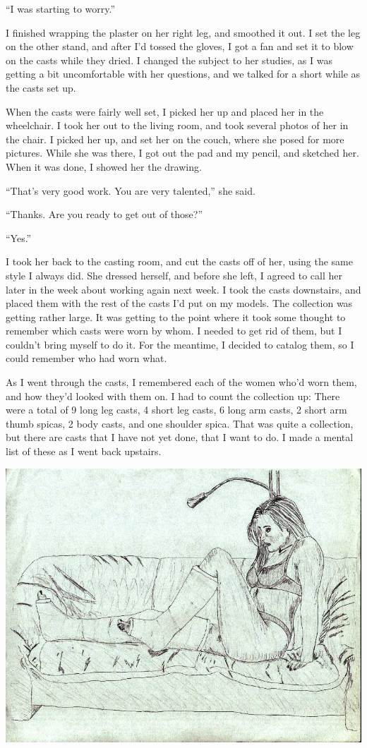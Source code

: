 ``I was starting to worry.''

I finished wrapping the plaster on her right leg, and smoothed it out. I set the leg on
the other stand, and after I'd tossed the gloves, I got a fan and set it to blow on the casts
while they dried. I changed the subject to her studies, as I was getting a bit uncomfortable
with her questions, and we talked for a short while as the casts set up.

When the casts were fairly well set, I picked her up and placed her in the wheelchair. I
took her out to the living room, and took several photos of her in the chair. I picked her up,
and set her on the couch, where she posed for more pictures. While she was there, I got out the
pad and my pencil, and sketched her. When it was done, I showed her the drawing.


``That's very good work. You are very talented,'' she said.

``Thanks. Are you ready to get out of those?''

``Yes.''

I took her back to the casting room, and cut the casts off of her, using the same style I
always did. She dressed herself, and before she left, I agreed to call her later in the week
about working again next week. I took the casts downstairs, and placed them with the rest of the
casts I'd put on my models. The collection was getting rather large. It was getting to the point
where it took some thought to remember which casts were worn by whom. I needed to get rid of
them, but I couldn't bring myself to do it. For the meantime, I decided to catalog them, so I
could remember who had worn what.

As I went through the casts, I remembered each of the women who'd worn them, and how
they'd looked with them on. I had to count the collection up: There were a total of 9 long leg
casts, 4 short leg casts, 6 long arm casts, 2 short arm thumb spicas, 2 body casts, and one
shoulder spica. That was quite a collection, but there are casts that I have not yet done, that
I want to do. I made a mental list of these as I went back upstairs.

\newpage
\begin{center}
\includegraphics{images/kicks25.jpg}
\end{center}
